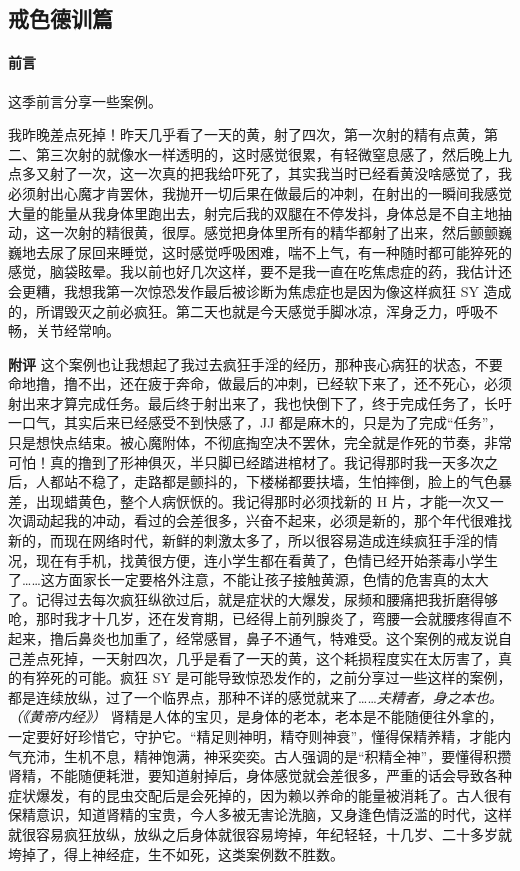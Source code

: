 \subsection{戒色德训篇}

\paragraph{前言}

这季前言分享一些案例。

\begin{case}
    我昨晚差点死掉！昨天几乎看了一天的黄，射了四次，第一次射的精有点黄，第二、第三次射的就像水一样透明的，这时感觉很累，有轻微窒息感了，然后晚上九点多又射了一次，这一次真的把我给吓死了，其实我当时已经看黄没啥感觉了，我必须射出心魔才肯罢休，我抛开一切后果在做最后的冲刺，在射出的一瞬间我感觉大量的能量从我身体里跑出去，射完后我的双腿在不停发抖，身体总是不自主地抽动，这一次射的精很黄，很厚。感觉把身体里所有的精华都射了出来，然后颤颤巍巍地去尿了尿回来睡觉，这时感觉呼吸困难，喘不上气，有一种随时都可能猝死的感觉，脑袋眩晕。我以前也好几次这样，要不是我一直在吃焦虑症的药，我估计还会更糟，我想我第一次惊恐发作最后被诊断为焦虑症也是因为像这样疯狂 SY 造成的，所谓毁灭之前必疯狂。第二天也就是今天感觉手脚冰凉，浑身乏力，呼吸不畅，关节经常响。

    \textbf{附评} 这个案例也让我想起了我过去疯狂手淫的经历，那种丧心病狂的状态，不要命地撸，撸不出，还在疲于奔命，做最后的冲刺，已经软下来了，还不死心，必须射出来才算完成任务。最后终于射出来了，我也快倒下了，终于完成任务了，长吁一口气，其实后来已经感受不到快感了，JJ 都是麻木的，只是为了完成“任务”，只是想快点结束。被心魔附体，不彻底掏空决不罢休，完全就是作死的节奏，非常可怕！真的撸到了形神俱灭，半只脚已经踏进棺材了。我记得那时我一天多次之后，人都站不稳了，走路都是颤抖的，下楼梯都要扶墙，生怕摔倒，脸上的气色暴差，出现蜡黄色，整个人病恹恹的。我记得那时必须找新的 H 片，才能一次又一次调动起我的冲动，看过的会差很多，兴奋不起来，必须是新的，那个年代很难找新的，而现在网络时代，新鲜的刺激太多了，所以很容易造成连续疯狂手淫的情况，现在有手机，找黄很方便，连小学生都在看黄了，色情已经开始荼毒小学生了……这方面家长一定要格外注意，不能让孩子接触黄源，色情的危害真的太大了。记得过去每次疯狂纵欲过后，就是症状的大爆发，尿频和腰痛把我折磨得够呛，那时我才十几岁，还在发育期，已经得上前列腺炎了，弯腰一会就腰疼得直不起来，撸后鼻炎也加重了，经常感冒，鼻子不通气，特难受。这个案例的戒友说自己差点死掉，一天射四次，几乎是看了一天的黄，这个耗损程度实在太厉害了，真的有猝死的可能。疯狂 SY 是可能导致惊恐发作的，之前分享过一些这样的案例，都是连续放纵，过了一个临界点，那种不详的感觉就来了……\textit{夫精者，身之本也。（《黄帝内经》）} 肾精是人体的宝贝，是身体的老本，老本是不能随便往外拿的，一定要好好珍惜它，守护它。“精足则神明，精夺则神衰”，懂得保精养精，才能内气充沛，生机不息，精神饱满，神采奕奕。古人强调的是“积精全神”，要懂得积攒肾精，不能随便耗泄，要知道射掉后，身体感觉就会差很多，严重的话会导致各种症状爆发，有的昆虫交配后是会死掉的，因为赖以养命的能量被消耗了。古人很有保精意识，知道肾精的宝贵，今人多被无害论洗脑，又身逢色情泛滥的时代，这样就很容易疯狂放纵，放纵之后身体就很容易垮掉，年纪轻轻，十几岁、二十多岁就垮掉了，得上神经症，生不如死，这类案例数不胜数。


\end{case}
